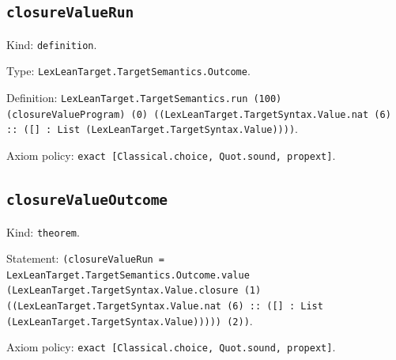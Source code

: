 \documentclass[11pt]{article}
\begin{document}
\subsection*{\texttt{closureValueRun}}
\noindent Kind: \texttt{definition}.\par
\noindent Type: \texttt{LexLeanTarget.TargetSemantics.Outcome}.\par
\noindent Definition: \texttt{LexLeanTarget.TargetSemantics.run (100) (closureValueProgram) (0) ((LexLeanTarget.TargetSyntax.Value.nat (6) :: ([] : List (LexLeanTarget.TargetSyntax.Value))))}.\par
\noindent Axiom policy: \texttt{exact [Classical.choice, Quot.sound, propext]}.\par
\subsection*{\texttt{closureValueOutcome}}
\noindent Kind: \texttt{theorem}.\par
\noindent Statement: \texttt{(closureValueRun = LexLeanTarget.TargetSemantics.Outcome.value (LexLeanTarget.TargetSyntax.Value.closure (1) ((LexLeanTarget.TargetSyntax.Value.nat (6) :: ([] : List (LexLeanTarget.TargetSyntax.Value))))) (2))}.\par
\noindent Axiom policy: \texttt{exact [Classical.choice, Quot.sound, propext]}.\par
\end{document}

